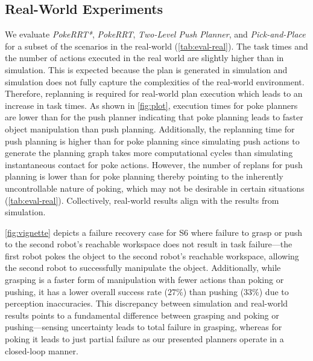 \subsection{Real-World Experiments}

We evaluate \textsl{PokeRRT*}, \textsl{PokeRRT}, \textsl{Two-Level Push Planner}, and \textsl{Pick-and-Place} for a subset of the scenarios in the real-world (\cref{tab:eval-real}). The task times and the number of actions executed in the real world are slightly higher than in simulation. This is expected because the plan is generated in simulation and simulation does not fully capture the complexities of the real-world environment. Therefore, replanning is required for real-world plan execution which leads to an increase in task times. As shown in \cref{fig:plot}, execution times for poke planners are lower than for the push planner indicating that poke planning leads to faster object manipulation than push planning. Additionally, the replanning time for push planning is higher than for poke planning since simulating push actions to generate the planning graph takes more computational cycles than simulating instantaneous contact for poke actions. However, the number of replans for push planning is lower than for poke planning thereby pointing to the inherently uncontrollable nature of poking, which may not be desirable in certain situations (\cref{tab:eval-real}).
Collectively, real-world results align with the results from simulation.

\cref{fig:vignette} depicts a failure recovery case for S6 where failure to grasp or push to the second robot's reachable workspace does not result in task failure---the first robot pokes the object to the second robot's reachable workspace, allowing the second robot to successfully manipulate the object.
Additionally, while grasping is a faster form of manipulation with fewer actions than poking or pushing, it has a lower overall success rate ($27\%$) than pushing ($33\%$) due to perception inaccuracies. This discrepancy between simulation and real-world results points to a fundamental difference between grasping and poking or pushing---sensing uncertainty leads to total failure in grasping, whereas for poking it leads to just partial failure as our presented planners operate in a closed-loop manner. 
